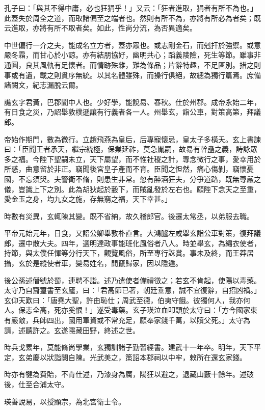 
\begin{pinyinscope}
孔子曰：「與其不得中庸，必也狂狷乎！」又云：「狂者進取，狷者有所不為也。」此蓋失於周全之道，而取諸偏至之端者也。然則有所不為，亦將有所必為者矣；既云進取，亦將有所不取者矣。如此，性尚分流，為否異適矣。

中世偏行一介之夫，能成名立方者，蓋亦眾也。或志剛金石，而剋扞於強禦。或意嚴冬霜，而甘心於小諒。亦有結朋協好，幽明共心；蹈義陵險，死生等節。雖事非通圓，良其風軌有足懷者。而情跡殊雜，難為條品；片辭特趣，不足區別。措之則事或有遺，載之則貫序無統。以其名體雖殊，而操行俱絕，故總為獨行篇焉。庶備諸闕文，紀志漏脫云爾。

譙玄字君黃，巴郡閬中人也。少好學，能說易、春秋。仕於州郡。成帝永始二年，有日食之災，乃詔舉敦樸遜讓有行義者各一人。州舉玄，詣公車，對策高第，拜議郎。

帝始作期門，數為微行。立趙飛燕為皇后，后專寵懷忌，皇太子多橫夭。玄上書諫曰：「臣聞王者承天，繼宗統極，保業延祚，莫急胤嗣，故易有幹蠱之義，詩詠眾多之福。今陛下聖嗣未立，天下屬望，而不惟社稷之計，專念微行之事，愛幸用於所惑，曲意留於非正。竊聞後宮皇子產而不育。臣聞之怛然，痛心傷剝，竊懷憂國，不忘須臾。夫警衛不脩，則患生非常。忽有醉酒狂夫，分爭道路，既無尊嚴之儀，豈識上下之別。此為胡狄起於轂下，而賊亂發於左右也。願陛下念天之至重，愛金玉之身，均九女之施，存無窮之福，天下幸甚。」

時數有災異，玄輒陳其變。既不省納，故久稽郎官。後遷太常丞，以弟服去職。

平帝元始元年，日食，又詔公卿舉敦朴直言。大鴻臚左咸舉玄詣公車對策，復拜議郎，遷中散大夫。四年，選明達政事能班化風俗者八人。時並舉玄，為繡衣使者，持節，與太僕任惲等分行天下，觀覽風俗，所至專行誅賞。事未及終，而王莽居攝，玄於是縱使者車，變易姓名，閒竄歸家，因以隱遁。

後公孫述僭號於蜀，連聘不詣。述乃遣使者備禮徵之；若玄不肯起，使陽以毒藥。太守乃自齎璽書至玄廬，曰：「君高節已著，朝廷垂意，誠不宜復辭，自招凶禍。」玄仰天歎曰：「唐堯大聖，許由恥仕；周武至德，伯夷守餓。彼獨何人，我亦何人。保志全高，死亦奚恨！」遂受毒藥。玄子瑛泣血叩頭於太守曰：「方今國家東有嚴敵，兵師四出，國用軍資或不常充足，願奉家錢千萬，以贖父死。」太守為請，述聽許之。玄遂隱藏田野，終述之世。

時兵戈累年，莫能脩尚學業，玄獨訓諸子勤習經書。建武十一年卒。明年，天下平定，玄弟慶以狀詣闕自陳。光武美之，策詔本郡祠以中牢，敕所在還玄家錢。

時亦有犍為費貽，不肯仕述，乃漆身為厲，陽狂以避之，退藏山藪十餘年。述破後，仕至合浦太守。

瑛善說易，以授顯宗，為北宮衛士令。


\end{pinyinscope}

